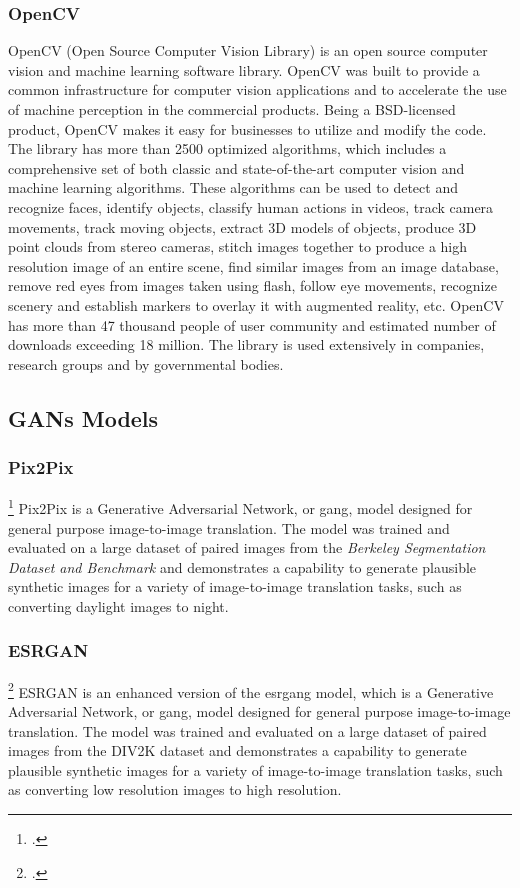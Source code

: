 \subsubsection*{OpenCV}
\label{subsubsec:opencv}
OpenCV (Open Source Computer Vision Library) is an open source computer vision
and machine learning software library. OpenCV was built to provide a common
infrastructure for computer vision applications and to accelerate the use of
machine perception in the commercial products. Being a BSD-licensed product,    
OpenCV makes it easy for businesses to utilize and modify the code. The library
has more than 2500 optimized algorithms, which includes a comprehensive set of
both classic and state-of-the-art computer vision and machine learning
algorithms. These algorithms can be used to detect and recognize faces, identify
objects, classify human actions in videos, track camera movements, track moving
objects, extract 3D models of objects, produce 3D point clouds from stereo
cameras, stitch images together to produce a high resolution image of an entire
scene, find similar images from an image database, remove red eyes from images
taken using flash, follow eye movements, recognize scenery and establish markers
to overlay it with augmented reality, etc. OpenCV has more than 47 thousand
people of user community and estimated number of downloads exceeding 18 million.
The library is used extensively in companies, research groups and by governmental
bodies.
\subsection*{GANs Models}
\label{subsec:gans-models}
\subsubsection*{Pix2Pix}\footcite{paper:pix2pix}
\label{subsubsec:pix2pix}
Pix2Pix is a Generative Adversarial Network, or \gls{gang}, model designed for general
purpose image-to-image translation. The model was trained and evaluated on a
large dataset of paired images from the \textit{Berkeley Segmentation Dataset
and Benchmark} and demonstrates a capability to generate plausible synthetic
images for a variety of image-to-image translation tasks, such as converting
daylight images to night.

\subsubsection*{ESRGAN}\footcite{paper:esrgan}
\label{subsubsec:esrgan}
ESRGAN is an enhanced version of the \gls{esrgang} model, which is a Generative
Adversarial Network, or \gls{gang}, model designed for general purpose
image-to-image translation. The model was trained and evaluated on a large
dataset of paired images from the DIV2K dataset and demonstrates a capability to
generate plausible synthetic images for a variety of image-to-image translation
tasks, such as converting low resolution images to high resolution.

